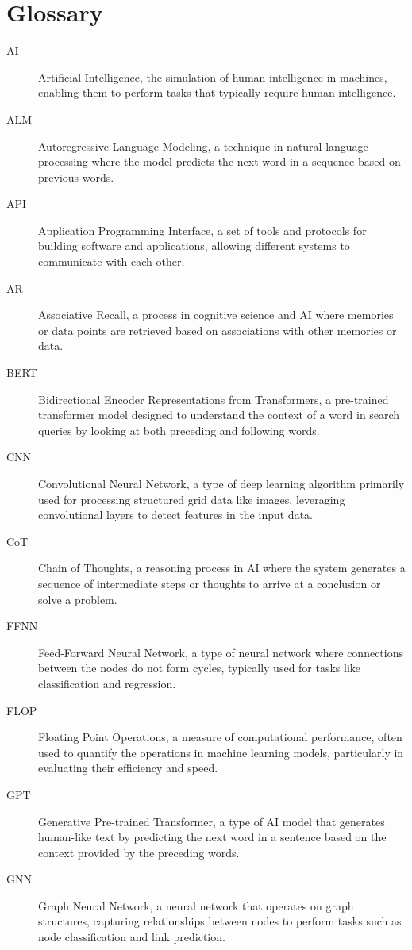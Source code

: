 \section*{Glossary}
\begin{description}
    \item[AI] Artificial Intelligence, the simulation of human intelligence in machines, enabling them to perform tasks that typically require human intelligence.
    \item[ALM] Autoregressive Language Modeling, a technique in natural language processing where the model predicts the next word in a sequence based on previous words.
    \item[API] Application Programming Interface, a set of tools and protocols for building software and applications, allowing different systems to communicate with each other.
    \item[AR] Associative Recall, a process in cognitive science and AI where memories or data points are retrieved based on associations with other memories or data.
    \item[BERT] Bidirectional Encoder Representations from Transformers, a pre-trained transformer model designed to understand the context of a word in search queries by looking at both preceding and following words.
    \item[CNN] Convolutional Neural Network, a type of deep learning algorithm primarily used for processing structured grid data like images, leveraging convolutional layers to detect features in the input data.
    \item[CoT] Chain of Thoughts, a reasoning process in AI where the system generates a sequence of intermediate steps or thoughts to arrive at a conclusion or solve a problem.
    \item[FFNN] Feed-Forward Neural Network, a type of neural network where connections between the nodes do not form cycles, typically used for tasks like classification and regression.
    \item[FLOP] Floating Point Operations, a measure of computational performance, often used to quantify the operations in machine learning models, particularly in evaluating their efficiency and speed.
    \item[GPT] Generative Pre-trained Transformer, a type of AI model that generates human-like text by predicting the next word in a sentence based on the context provided by the preceding words.
    \item[GNN] Graph Neural Network, a neural network that operates on graph structures, capturing relationships between nodes to perform tasks such as node classification and link prediction.

\end{description}
